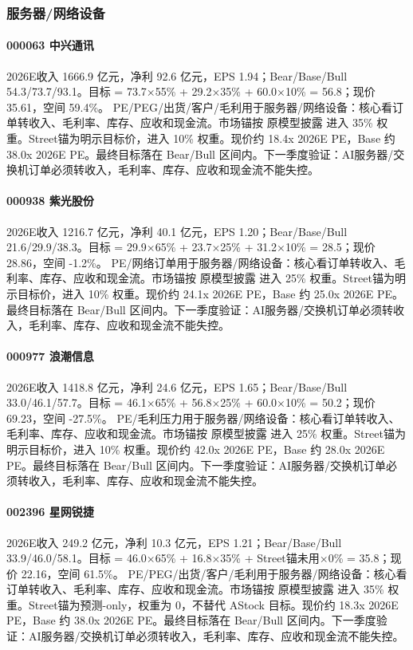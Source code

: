\subsubsection*{服务器/网络设备}
\paragraph{000063 中兴通讯} 2026E收入 1666.9 亿元，净利 92.6 亿元，EPS 1.94；Bear/Base/Bull 54.3/73.7/93.1。目标 = 73.7×55\% + 29.2×35\% + 60.0×10\% = 56.8；现价 35.61，空间 59.4\%。 PE/PEG/出货/客户/毛利用于服务器/网络设备：核心看订单转收入、毛利率、库存、应收和现金流。市场锚按 原模型披露 进入 35\% 权重。Street锚为明示目标价，进入 10\% 权重。现价约 18.4x 2026E PE，Base 约 38.0x 2026E PE。最终目标落在 Bear/Bull 区间内。下一季度验证：AI服务器/交换机订单必须转收入，毛利率、库存、应收和现金流不能失控。
\paragraph{000938 紫光股份} 2026E收入 1216.7 亿元，净利 40.1 亿元，EPS 1.20；Bear/Base/Bull 21.6/29.9/38.3。目标 = 29.9×65\% + 23.7×25\% + 31.2×10\% = 28.5；现价 28.86，空间 -1.2\%。 PE/网络订单用于服务器/网络设备：核心看订单转收入、毛利率、库存、应收和现金流。市场锚按 原模型披露 进入 25\% 权重。Street锚为明示目标价，进入 10\% 权重。现价约 24.1x 2026E PE，Base 约 25.0x 2026E PE。最终目标落在 Bear/Bull 区间内。下一季度验证：AI服务器/交换机订单必须转收入，毛利率、库存、应收和现金流不能失控。
\paragraph{000977 浪潮信息} 2026E收入 1418.8 亿元，净利 24.6 亿元，EPS 1.65；Bear/Base/Bull 33.0/46.1/57.7。目标 = 46.1×65\% + 56.8×25\% + 60.0×10\% = 50.2；现价 69.23，空间 -27.5\%。 PE/毛利压力用于服务器/网络设备：核心看订单转收入、毛利率、库存、应收和现金流。市场锚按 原模型披露 进入 25\% 权重。Street锚为明示目标价，进入 10\% 权重。现价约 42.0x 2026E PE，Base 约 28.0x 2026E PE。最终目标落在 Bear/Bull 区间内。下一季度验证：AI服务器/交换机订单必须转收入，毛利率、库存、应收和现金流不能失控。
\paragraph{002396 星网锐捷} 2026E收入 249.2 亿元，净利 10.3 亿元，EPS 1.21；Bear/Base/Bull 33.9/46.0/58.1。目标 = 46.0×65\% + 16.8×35\% + Street锚未用×0\% = 35.8；现价 22.16，空间 61.5\%。 PE/PEG/出货/客户/毛利用于服务器/网络设备：核心看订单转收入、毛利率、库存、应收和现金流。市场锚按 原模型披露 进入 35\% 权重。Street锚为预测-only，权重为 0，不替代 AStock 目标。现价约 18.3x 2026E PE，Base 约 38.0x 2026E PE。最终目标落在 Bear/Bull 区间内。下一季度验证：AI服务器/交换机订单必须转收入，毛利率、库存、应收和现金流不能失控。
